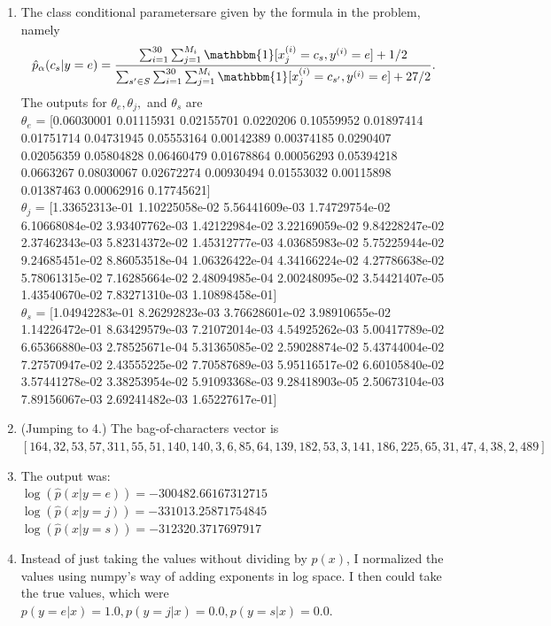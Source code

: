 \documentclass[a4paper]{article}
\theoremstyle{definition}
\def\one{\mathbbm{1}}
\begin{document}
\begin{enumerate}
\begin{enumerate}
		\item The class conditional parametersare given by the formula in the problem, namely
		\[ \hat p_\alpha(c_s | y=e) = \dfrac{\sum_{i=1}^{30} \sum_{j=1}^{M_i} \one[x_j^{(i)} = c_s, y^{(i)}=e] + 1/2}{\sum_{s'\in S}\sum_{i=1}^{30}\sum_{j=1}^{M_i} \one[x_j^{(i)} = c_{s'}, y^{(i)}=e] + 27/2}.\]
		The outputs for $ \theta_e,\theta_j,$ and $\theta_s $ are \\
		$ \theta_e $ = [0.06030001 0.01115931 0.02155701 0.0220206  0.10559952 0.01897414
		0.01751714 0.04731945 0.05553164 0.00142389 0.00374185 0.0290407
		0.02056359 0.05804828 0.06460479 0.01678864 0.00056293 0.05394218
		0.0663267  0.08030067 0.02672274 0.00930494 0.01553032 0.00115898
		0.01387463 0.00062916 0.17745621]\\
		$ \theta_j $ = [1.33652313e-01 1.10225058e-02 5.56441609e-03 1.74729754e-02
		6.10668084e-02 3.93407762e-03 1.42122984e-02 3.22169059e-02
		9.84228247e-02 2.37462343e-03 5.82314372e-02 1.45312777e-03
		4.03685983e-02 5.75225944e-02 9.24685451e-02 8.86053518e-04
		1.06326422e-04 4.34166224e-02 4.27786638e-02 5.78061315e-02
		7.16285664e-02 2.48094985e-04 2.00248095e-02 3.54421407e-05
		1.43540670e-02 7.83271310e-03 1.10898458e-01]\\
		$ \theta_s $ = [1.04942283e-01 8.26292823e-03 3.76628601e-02 3.98910655e-02
		1.14226472e-01 8.63429579e-03 7.21072014e-03 4.54925262e-03
		5.00417789e-02 6.65366880e-03 2.78525671e-04 5.31365085e-02
		2.59028874e-02 5.43744004e-02 7.27570947e-02 2.43555225e-02
		7.70587689e-03 5.95116517e-02 6.60105840e-02 3.57441278e-02
		3.38253954e-02 5.91093368e-03 9.28418903e-05 2.50673104e-03
		7.89156067e-03 2.69241482e-03 1.65227617e-01]
		
		\item (Jumping to 4.) The bag-of-characters vector is \\$ [164,  32,  53,  57, 311,  55,  51, 140, 140,   3,   6,  85,  64,
		139, 182,  53,   3, 141, 186, 225,  65,  31,  47,   4,  38,   2,
		489] $
		
		\item The output was:\\
		$ \log(\hat p(x|y=e)) = -300482.66167312715 $\\
		$ \log(\hat p(x|y=j)) = -331013.25871754845 $\\
		$ \log(\hat p(x|y=s)) = -312320.3717697917 $
		
		\item Instead of just taking the values without dividing by $ p(x) $, I normalized the values using numpy's way of adding exponents in log space. I then could take the true values, which were $ p(y=e|x) = 1.0, 
		p(y=j|x) = 0.0,
		p(y=s|x) = 0.0 $.
		

\end{enumerate}
\end{enumerate}
\end{document}
